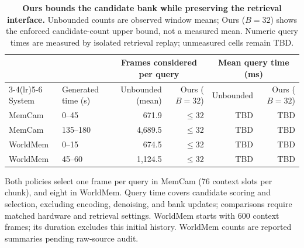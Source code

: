 \begin{table}[t]
\centering
\small
\caption{\textbf{Ours bounds the candidate bank while preserving the retrieval interface.} Unbounded counts are observed window means; Ours ($B=32$) shows the enforced candidate-count upper bound, not a measured mean. Numeric query times are measured by isolated retrieval replay; unmeasured cells remain TBD.}
\label{tab:lookup-work}
\begin{tabular}{llrrrr}
\toprule
& & \multicolumn{2}{c}{Frames considered per query} & \multicolumn{2}{c}{Mean query time (ms)} \\
\cmidrule(lr){3-4}\cmidrule(lr){5-6}
System & Generated time (s) & Unbounded (mean) & Ours ($B=32$) & Unbounded & Ours ($B=32$) \\
\midrule
MemCam & 0--45 & 671.9 & $\leq 32$ & TBD & TBD \\
MemCam & 135--180 & 4,689.5 & $\leq 32$ & TBD & TBD \\
\midrule
WorldMem & 0--15 & 674.5 & $\leq 32$ & TBD & TBD \\
WorldMem & 45--60 & 1,124.5 & $\leq 32$ & TBD & TBD \\
\bottomrule
\end{tabular}
\par\smallskip
\begin{minipage}{\linewidth}\footnotesize
Both policies select one frame per query in MemCam (76 context slots per chunk), and eight in WorldMem. Query time covers candidate scoring and selection, excluding encoding, denoising, and bank updates; comparisons require matched hardware and retrieval settings. WorldMem starts with 600 context frames; its duration excludes this initial history. WorldMem counts are reported summaries pending raw-source audit.
\end{minipage}
\end{table}

